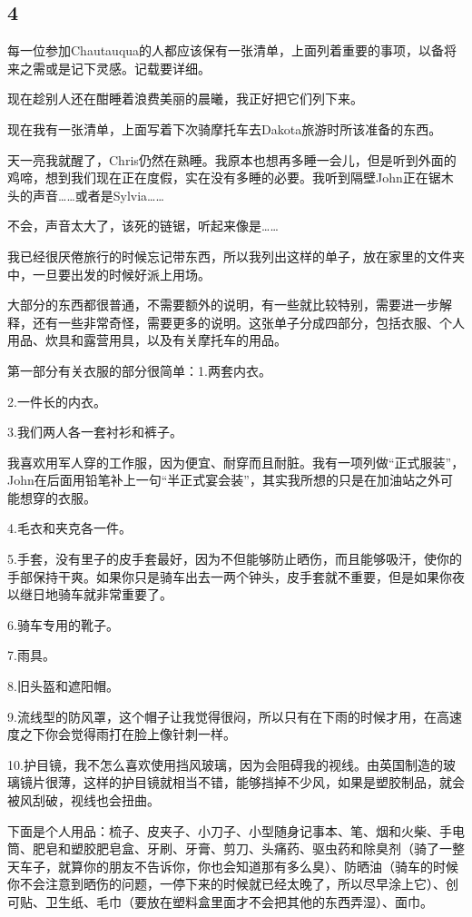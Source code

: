 \documentclass[UTF8]{article}
\begin{document}
\subsection*{4}
\par 每一位参加Chautauqua的人都应该保有一张清单，上面列着重要的事项，以备将来之需或是记下灵感。记载要详细。
\par 现在趁别人还在酣睡着浪费美丽的晨曦，我正好把它们列下来。
\par 现在我有一张清单，上面写着下次骑摩托车去Dakota旅游时所该准备的东西。
\par 天一亮我就醒了，Chris仍然在熟睡。我原本也想再多睡一会儿，但是听到外面的鸡啼，想到我们现在正在度假，实在没有多睡的必要。我听到隔壁John正在锯木头的声音……或者是Sylvia……
\par 不会，声音太大了，该死的链锯，听起来像是……
\par 我已经很厌倦旅行的时候忘记带东西，所以我列出这样的单子，放在家里的文件夹中，一旦要出发的时候好派上用场。
\par 大部分的东西都很普通，不需要额外的说明，有一些就比较特别，需要进一步解释，还有一些非常奇怪，需要更多的说明。这张单子分成四部分，包括衣服、个人用品、炊具和露营用具，以及有关摩托车的用品。
\par 第一部分有关衣服的部分很简单：1.两套内衣。
\par 2.一件长的内衣。
\par 3.我们两人各一套衬衫和裤子。
\par 我喜欢用军人穿的工作服，因为便宜、耐穿而且耐脏。我有一项列做“正式服装”，John在后面用铅笔补上一句“半正式宴会装”，其实我所想的只是在加油站之外可能想穿的衣服。
\par 4.毛衣和夹克各一件。
\par 5.手套，没有里子的皮手套最好，因为不但能够防止晒伤，而且能够吸汗，使你的手部保持干爽。如果你只是骑车出去一两个钟头，皮手套就不重要，但是如果你夜以继日地骑车就非常重要了。
\par 6.骑车专用的靴子。
\par 7.雨具。
\par 8.旧头盔和遮阳帽。
\par 9.流线型的防风罩，这个帽子让我觉得很闷，所以只有在下雨的时候才用，在高速度之下你会觉得雨打在脸上像针刺一样。
\par 10.护目镜，我不怎么喜欢使用挡风玻璃，因为会阻碍我的视线。由英国制造的玻璃镜片很薄，这样的护目镜就相当不错，能够挡掉不少风，如果是塑胶制品，就会被风刮破，视线也会扭曲。
\par 下面是个人用品：梳子、皮夹子、小刀子、小型随身记事本、笔、烟和火柴、手电筒、肥皂和塑胶肥皂盒、牙刷、牙膏、剪刀、头痛药、驱虫药和除臭剂（骑了一整天车子，就算你的朋友不告诉你，你也会知道那有多么臭）、防晒油（骑车的时候你不会注意到晒伤的问题，一停下来的时候就已经太晚了，所以尽早涂上它）、创可贴、卫生纸、毛巾（要放在塑料盒里面才不会把其他的东西弄湿）、面巾。
\end{document}
